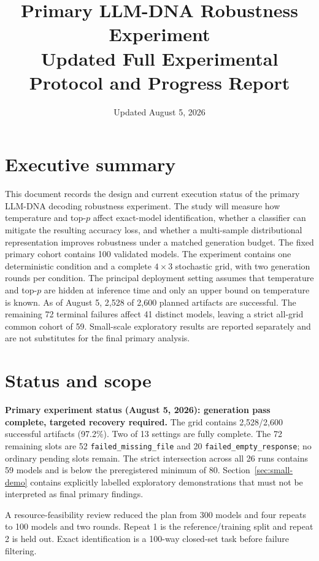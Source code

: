 \documentclass[11pt,a4paper]{article}
\title{Primary LLM-DNA Robustness Experiment\\
\large Updated Full Experimental Protocol and Progress Report}
\author{}
\date{Updated August 5, 2026}
\begin{document}
\maketitle

\section*{Executive summary}
This document records the design and current execution status of the primary
LLM-DNA decoding robustness experiment. The study
will measure how temperature and top-$p$ affect exact-model identification,
whether a classifier can mitigate the resulting accuracy loss, and whether a
multi-sample distributional representation improves robustness under a matched
generation budget. The fixed primary cohort contains 100 validated models.
The experiment contains one deterministic condition and a complete
$4\times3$ stochastic grid, with two generation rounds per condition. The
principal deployment setting
assumes that temperature and top-$p$ are hidden at inference time and only an
upper bound on temperature is known. As of August 5, 2,528 of 2,600 planned
artifacts are successful. The remaining 72 terminal failures affect 41 distinct
models, leaving a strict all-grid common cohort of 59. Small-scale exploratory
results are reported separately and are not substitutes for the final primary
analysis.
\par

\section{Status and scope}

\textbf{Primary experiment status (August 5, 2026): generation pass complete,
targeted recovery required.} The grid contains 2,528/2,600 successful artifacts
(97.2\%). Two of 13 settings are fully complete. The 72 remaining slots are
52 \texttt{failed\_missing\_file} and 20
\texttt{failed\_empty\_response}; no ordinary pending slots remain. The strict
intersection across all 26 runs contains 59 models and is below the
preregistered minimum of 80. Section~\ref{sec:small-demo} contains explicitly
labelled exploratory demonstrations that must not be interpreted as final
primary findings.

A resource-feasibility review reduced the plan from 300 models and four repeats
to 100 models and two rounds. Repeat 1 is the reference/training split and
repeat 2 is held out. Exact identification is a 100-way closed-set task before
failure filtering.
\end{document}
